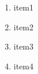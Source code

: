 \documentclass{article}
\begin{document}
    \begin{enumerate}
        \item item1
        \item item2
        \item item3
        \item item4
    \end{enumerate}
\end{document}
